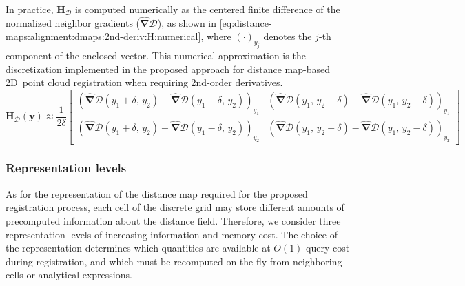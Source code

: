 In practice, $\mathbf{H}_{\mathcal{D}}$ is computed numerically as the centered
finite difference of the normalized neighbor gradients
($\hat{\bm{\nabla}}\mathcal{D}$), as shown in
\eqref{eq:distance-maps:alignment:dmaps:2nd-deriv:H:numerical},
where $(\cdot)_{y_j}$ denotes the $j$-th component of the enclosed vector.
This numerical approximation is the discretization implemented in the proposed
approach for distance map-based 2D~point cloud registration
when requiring 2nd-order derivatives.
\begin{equation}
\label{eq:distance-maps:alignment:dmaps:2nd-deriv:H:numerical}
\mathbf{H}_{\mathcal{D}}(\mathbf{y}) \approx
\frac{1}{2\delta}
\begin{bmatrix}
\left(
    \hat{\bm{\nabla}}\mathcal{D}(y_1{+}\delta,\,y_2) -
    \hat{\bm{\nabla}}\mathcal{D}(y_1{-}\delta,\,y_2)
\right)_{y_1} &
\left(
    \hat{\bm{\nabla}}\mathcal{D}(y_1,\,y_2{+}\delta) -
    \hat{\bm{\nabla}}\mathcal{D}(y_1,\,y_2{-}\delta)
\right)_{y_1} \\[8pt]
\left(
    \hat{\bm{\nabla}}\mathcal{D}(y_1{+}\delta,\,y_2) -
    \hat{\bm{\nabla}}\mathcal{D}(y_1{-}\delta,\,y_2)
\right)_{y_2} &
\left(
    \hat{\bm{\nabla}}\mathcal{D}(y_1,\,y_2{+}\delta) -
    \hat{\bm{\nabla}}\mathcal{D}(y_1,\,y_2{-}\delta)
\right)_{y_2}
\end{bmatrix}
\end{equation}

\subsubsection{Representation levels}
\label{sec:distance-maps:alignment:dmaps:representation}

As for the representation of the distance map required for the proposed
registration process, each cell of the discrete grid may store different amounts
of precomputed information about the distance field. Therefore, we consider
three representation levels of increasing information and memory cost.
The choice of the representation determines which quantities are available at
$O(1)$ query cost during registration, and which must be recomputed on the fly
from neighboring cells or analytical expressions.


